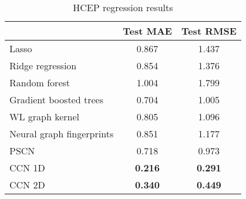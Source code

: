 \begin{table}[t]
\caption{\label{tbl:hcep} HCEP regression results}
\centering
\begin{tabular}{||l | c | c ||}
	\hline
	& Test MAE & Test RMSE \\
	\hline\hline
	Lasso & 0.867 & 1.437 \\
	\hline
	Ridge regression & 0.854 & 1.376 \\
	\hline
	Random forest & 1.004 & 1.799 \\
	\hline
	Gradient boosted trees & 0.704 & 1.005 \\
	\hline
	WL graph kernel & 0.805 & 1.096 \\
	\hline
	Neural graph fingerprints & 0.851 & 1.177 \\
	\hline
	PSCN & 0.718 & 0.973 \\
	\hline
	CCN 1D & \textbf{0.216} & \textbf{0.291} \\
	\hline
	CCN 2D & \textbf{0.340} & \textbf{0.449} \\
	\hline
\end{tabular}
\end{table}


